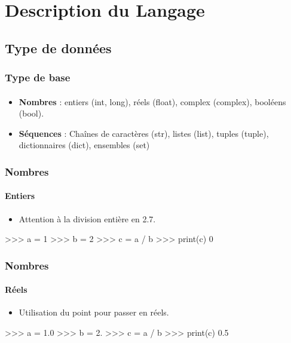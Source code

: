 \section{Description du Langage}
\subsection{Type de données}
\begin{frame}
\frametitle{Type de base}
\framesubtitle{}
\begin{itemize}
\item {\bfseries Nombres} : entiers (int, long), réels (float), complex (complex), booléens (bool). 
\item {\bfseries Séquences} : Chaînes de caractères (str), listes (list), tuples (tuple), dictionnaires (dict), ensembles (set)
\end{itemize}
\end{frame}
\begin{frame}[fragile]
\frametitle{Nombres}
\framesubtitle{Entiers}
\begin{itemize}
 \item Attention à la division entière en 2.7. 
\end{itemize}
\begin{pythonConsole}
>>> a = 1  
>>> b = 2
>>> c = a / b
>>> print(c)
0
\end{pythonConsole}
\end{frame}
\begin{frame}[fragile]
\frametitle{Nombres}
\framesubtitle{Réels}
\begin{itemize}
 \item Utilisation du point pour passer en réels. 
\end{itemize}
\begin{pythonConsole}
>>> a = 1.0
>>> b = 2.
>>> c = a / b
>>> print(c)
0.5
\end{pythonConsole}
\end{frame}
